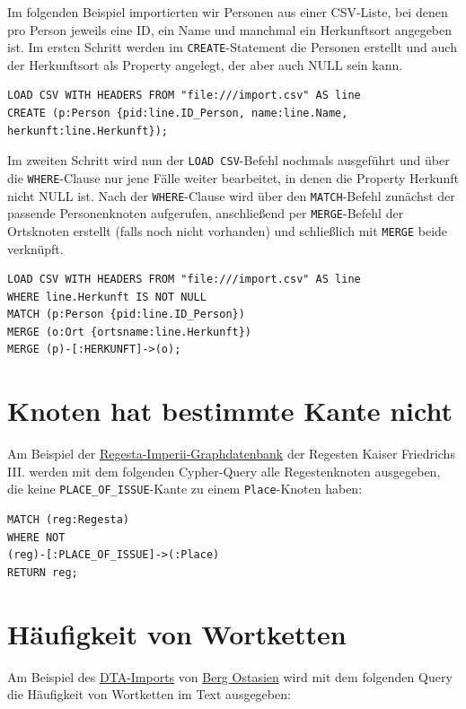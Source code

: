 \documentclass[ngerman,]{scrreprt}
\begin{document}
Im folgenden Beispiel importierten wir Personen aus einer CSV-Liste, bei denen pro Person jeweils eine ID, ein Name und manchmal ein Herkunftsort angegeben ist. Im ersten Schritt werden im \texttt{CREATE}-Statement die Personen erstellt und auch der Herkunftsort als Property angelegt, der aber auch NULL sein kann.

\begin{verbatim}
LOAD CSV WITH HEADERS FROM "file:///import.csv" AS line
CREATE (p:Person {pid:line.ID_Person, name:line.Name, herkunft:line.Herkunft});
\end{verbatim}

Im zweiten Schritt wird nun der \texttt{LOAD\ CSV}-Befehl nochmals ausgeführt und über die \texttt{WHERE}-Clause nur jene Fälle weiter bearbeitet, in denen die Property Herkunft nicht NULL ist. Nach der \texttt{WHERE}-Clause wird über den \texttt{MATCH}-Befehl zunächst der passende Personenknoten aufgerufen, anschließend per \texttt{MERGE}-Befehl der Ortsknoten erstellt (falls noch nicht vorhanden) und schließlich mit \texttt{MERGE} beide verknüpft.

\begin{verbatim}
LOAD CSV WITH HEADERS FROM "file:///import.csv" AS line
WHERE line.Herkunft IS NOT NULL
MATCH (p:Person {pid:line.ID_Person})
MERGE (o:Ort {ortsname:line.Herkunft})
MERGE (p)-[:HERKUNFT]->(o);
\end{verbatim}

\section{Knoten hat bestimmte Kante nicht}\label{knoten-hat-bestimmte-kante-nicht}

Am Beispiel der \href{http://134.176.70.65:10210/browser/}{Regesta-Imperii-Graphdatenbank} der Regesten Kaiser Friedrichs III. werden mit dem folgenden Cypher-Query alle Regestenknoten ausgegeben, die keine \texttt{PLACE\_OF\_ISSUE}-Kante zu einem \texttt{Place}-Knoten haben:

\begin{verbatim}
MATCH (reg:Regesta)
WHERE NOT
(reg)-[:PLACE_OF_ISSUE]->(:Place)
RETURN reg;
\end{verbatim}

\section{Häufigkeit von Wortketten}\label{huxe4ufigkeit-von-wortketten}

Am Beispiel des \href{http://134.176.70.65:10220/browser/}{DTA-Imports} von \href{http://www.deutschestextarchiv.de/book/show/berg_ostasien01_1864}{Berg Ostasien} wird mit dem folgenden Query die Häufigkeit von Wortketten im Text ausgegeben:
\end{document}
